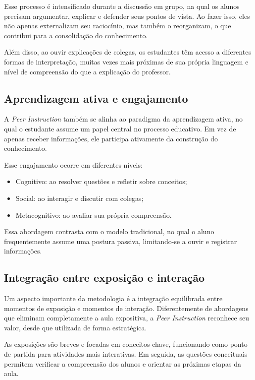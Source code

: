 Esse processo é intensificado durante a discussão em grupo, na qual os alunos precisam argumentar, explicar e defender seus pontos de vista. Ao fazer isso, eles não apenas externalizam seu raciocínio, mas também o reorganizam, o que contribui para a consolidação do conhecimento.

Além disso, ao ouvir explicações de colegas, os estudantes têm acesso a diferentes formas de interpretação, muitas vezes mais próximas de sua própria linguagem e nível de compreensão do que a explicação do professor.

\subsection{Aprendizagem ativa e engajamento}

A {\it Peer Instruction} também se alinha ao paradigma da aprendizagem ativa, no qual o estudante assume um papel central no processo educativo. Em vez de apenas receber informações, ele participa ativamente da construção do conhecimento.

Esse engajamento ocorre em diferentes níveis:

\begin{itemize}
    \item Cognitivo: ao resolver questões e refletir sobre conceitos;
    \item Social: ao interagir e discutir com colegas;
    \item Metacognitivo: ao avaliar sua própria compreensão.
\end{itemize}

Essa abordagem contrasta com o modelo tradicional, no qual o aluno frequentemente assume uma postura passiva, limitando-se a ouvir e registrar informações.

\subsection{Integração entre exposição e interação}

Um aspecto importante da metodologia é a integração equilibrada entre momentos de exposição e momentos de interação. Diferentemente de abordagens que eliminam completamente a aula expositiva, a {\it Peer Instruction} reconhece seu valor, desde que utilizada de forma estratégica.

As exposições são breves e focadas em conceitos-chave, funcionando como ponto de partida para atividades mais interativas. Em seguida, as questões conceituais permitem verificar a compreensão dos alunos e orientar as próximas etapas da aula.

